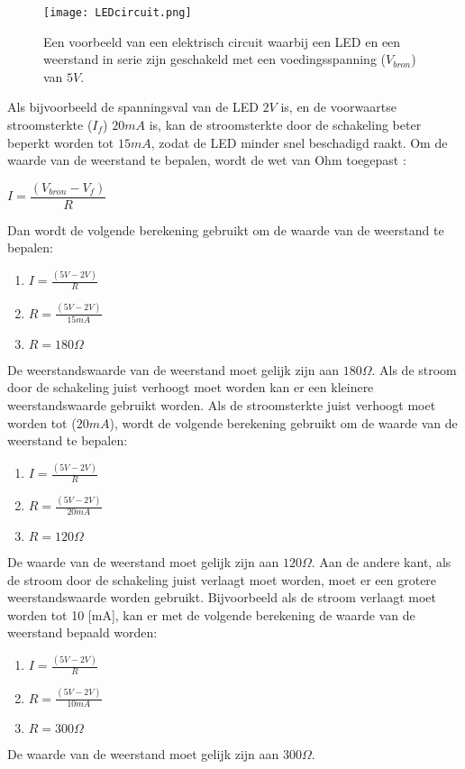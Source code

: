 \begin{figure}[h]
    \centering
    \texttt{[image: LEDcircuit.png]}
    \caption{Een voorbeeld van een elektrisch circuit waarbij een LED en een weerstand in serie zijn geschakeld met een voedingsspanning (\(V_{bron}\)) van \(5V\).}
    \label{fig:LEDcircuit}
    \end{figure}

Als bijvoorbeeld de spanningsval van de LED \(2V\) is, en de voorwaartse stroomsterkte (\(I_f\)) \(20mA\) is, kan de stroomsterkte door de schakeling beter beperkt worden tot \(15mA\), zodat de LED minder snel beschadigd raakt. 
Om de waarde van de weerstand te bepalen, wordt de wet van Ohm toegepast \cite{Schagrin1963}:

\begin{center}\(I = \dfrac{(V_{bron} - V_f)}{R}\)\end{center}

Dan wordt de volgende berekening gebruikt om de waarde van de weerstand te bepalen:
\begin{enumerate}
    \item \(I = \frac{(5V - 2V)}{R}\)\\
    \item \(R = \frac{(5V - 2V)}{15mA}\)\\
    \item \(R = 180\Omega\)
\end{enumerate}
De weerstandswaarde van de weerstand moet gelijk zijn aan \(180\Omega\).
Als de stroom door de schakeling juist verhoogt moet worden kan er een kleinere weerstandswaarde gebruikt worden. 
Als de stroomsterkte juist verhoogt moet worden tot (\(20mA\)), wordt de volgende berekening gebruikt om de waarde van de weerstand te bepalen:
\begin{enumerate}
    \item \(I = \frac{(5V - 2V)}{R}\)\\
    \item \(R = \frac{(5V - 2V)}{20mA}\)\\
    \item \(R = 120\Omega\)
\end{enumerate}
De waarde van de weerstand moet gelijk zijn aan \(120\Omega\).
Aan de andere kant, als de stroom door de schakeling juist verlaagt moet worden, moet er een grotere weerstandswaarde worden gebruikt. 
Bijvoorbeeld als de stroom verlaagt moet worden tot 10 [mA], kan er met de volgende berekening de waarde van de weerstand bepaald worden:
\begin{enumerate}
    \item \(I = \frac{(5V - 2V)}{R}\)\\
    \item \(R = \frac{(5V - 2V)}{10mA}\)\\
    \item \(R = 300\Omega\)
\end{enumerate}
De waarde van de weerstand moet gelijk zijn aan \(300\Omega\).

